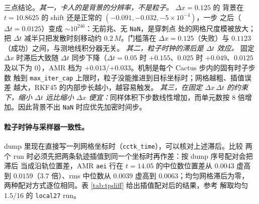 \documentclass[11pt,UTF8]{ctexart}
\begin{document}
三点结论。\emph{其一，卡人的是背景的分辨率，不是粒子。} $\Delta x=0.125$ 的
背景在 $t=10.8625$ 的 shift 还是正常的 $(-0.091,-0.032,-5\times10^{-4})$，一步
之后（$\Delta t=0.0125$）变成 $\sim10^{246}$：无前兆、无 \texttt{NaN}，是穿刺点
处的网格尺度模被放大；把 $\Delta t$ 减半只把发散时刻移动约 $0.2\,M$。门槛落在
$\Delta x=0.125$（失败）与 $0.1123$（成功）之间，与测地线积分器无关。
\emph{其二，粒子时钟的滞后是 $\Delta t$ 效应。} 固定 $\Delta x$ 时滞后大致随
$\Delta t$ 同步下降（$\Delta t=0.05$ 时 $+0.155$、$0.025$ 时 $+0.049$、$0.0125$
及以下为 $0$），AMR 档为 $+0.013$/$+0.033$。机制是每个 Cactus 步内的固有时子步数
触到 \texttt{max\_iter\_cap} 上限时，粒子没能推进到目标坐标时；网格越粗、插值误差
越大，RKF45 的内部步长越小，越容易触发。
\emph{其三，在固定 $\Delta x\,\Delta t$ 的约束下，缩小 $\Delta t$ 远比缩小
$\Delta x$ 便宜：}同样体积下步数线性增加，而单元数按 $8$ 倍增加。因此背景不出
\texttt{NaN} 时应优先加密时间步。

\paragraph{粒子时钟与采样器一致性。}
dump 里现在直接写一列网格坐标时（\texttt{cctk\_time}），可以核对上述滞后。比较
两个 run 时必须先把两条轨迹插值到同一个坐标时再作差：按 dump 序号配对会把滞后
当成沿轨位置差，AMR \texttt{aei} 行在 $t=14.05$ 的中位数位置差从 $0.0043$ 虚高到
$0.0159$（$3.7$ 倍）、rms 中位数从 $0.0039$ 虚高到 $0.0063$；均匀网格滞后为零，
两种配对方式逐位相同。表 \ref{tab:tpdiff} 给出插值配对后的结果，参考
解取均匀 $1.5/16$ 的 \texttt{local27} run。
\end{document}
